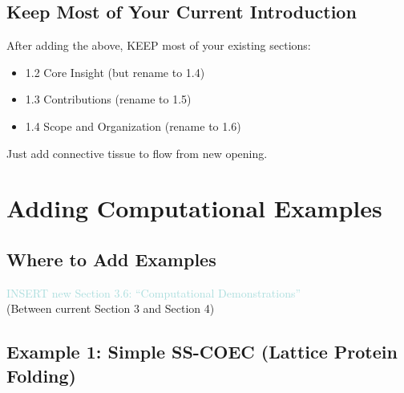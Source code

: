 \documentclass[11pt]{article}
\begin{document}
\subsection{Keep Most of Your Current Introduction}

\textcolor{keep}{After adding the above, KEEP most of your existing sections:}
\begin{itemize}
    \item 1.2 Core Insight (but rename to 1.4)
    \item 1.3 Contributions (rename to 1.5)
    \item 1.4 Scope and Organization (rename to 1.6)
\end{itemize}

Just add connective tissue to flow from new opening.

\section{Adding Computational Examples} \label{sec:examples}

\subsection{Where to Add Examples}

\textcolor{add}{INSERT new Section 3.6: ``Computational Demonstrations''} \\
(Between current Section 3 and Section 4)

\subsection{Example 1: Simple SS-COEC (Lattice Protein Folding)}
\end{document}
